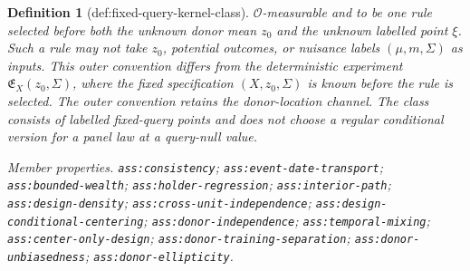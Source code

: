 \documentclass{article}
\newtheorem{definition}{Definition}
\begin{document}
\begin{definition}[def:fixed-query-kernel-class]
\(\mathcal O\)-measurable and to be one rule selected before both the unknown
donor mean \(z_0\) and the unknown labelled point \(\xi\).  Such a rule may
not take \(z_0\), potential outcomes, or nuisance labels \((\mu,m,\Sigma)\)
as inputs.  This outer convention differs from the deterministic experiment
\(\mathfrak E_X(z_0,\Sigma)\), where the fixed specification
\((X,z_0,\Sigma)\) is known before the rule is selected.  The outer
convention retains the donor-location channel.  The class consists of
labelled fixed-query points and does not choose a regular conditional version
for a panel law at a query-null value.
\par\smallskip\noindent\emph{Member properties.} \texttt{ass:\allowbreak{}consistency}; \texttt{ass:\allowbreak{}event-\allowbreak{}date-\allowbreak{}transport}; \texttt{ass:\allowbreak{}bounded-\allowbreak{}wealth}; \texttt{ass:\allowbreak{}holder-\allowbreak{}regression}; \texttt{ass:\allowbreak{}interior-\allowbreak{}path}; \texttt{ass:\allowbreak{}design-\allowbreak{}density}; \texttt{ass:\allowbreak{}cross-\allowbreak{}unit-\allowbreak{}independence}; \texttt{ass:\allowbreak{}design-\allowbreak{}conditional-\allowbreak{}centering}; \texttt{ass:\allowbreak{}donor-\allowbreak{}independence}; \texttt{ass:\allowbreak{}temporal-\allowbreak{}mixing}; \texttt{ass:\allowbreak{}center-\allowbreak{}only-\allowbreak{}design}; \texttt{ass:\allowbreak{}donor-\allowbreak{}training-\allowbreak{}separation}; \texttt{ass:\allowbreak{}donor-\allowbreak{}unbiasedness}; \texttt{ass:\allowbreak{}donor-\allowbreak{}ellipticity}.
\end{definition}
\end{document}
